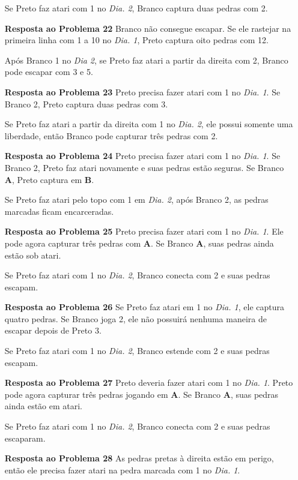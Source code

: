 \begin{itemize}
      Se Preto faz atari com 1 no \emph{Dia. 2}, Branco captura duas pedras com 2.
  \item[\textbf{Resposta ao Problema 22}]
      Branco não consegue escapar. Se ele rastejar na primeira linha com 1 a 10 no \emph{Dia. 1}, Preto captura oito pedras com 12.

      Após Branco 1 no \emph{Dia 2}, se Preto faz atari a partir da direita com 2, Branco pode escapar com 3 e 5.
  \item[\textbf{Resposta ao Problema 23}]
      Preto precisa fazer atari com 1 no \emph{Dia. 1}. Se Branco 2, Preto captura duas pedras com 3.

      Se Preto faz atari a partir da direita com 1 no \emph{Dia. 2}, ele possui somente uma liberdade, então Branco pode capturar três pedras com 2.
  \item[\textbf{Resposta ao Problema 24}]
      Preto precisa fazer atari com 1 no \emph{Dia. 1}. Se Branco 2, Preto faz atari novamente e suas pedras estão seguras. Se Branco \textbf{A}, Preto captura em \textbf{B}.

      Se Preto faz atari pelo topo com 1 em \emph{Dia. 2}, após Branco 2, as pedras marcadas ficam encarceradas.
  \item[\textbf{Resposta ao Problema 25}]
      Preto precisa fazer atari com 1 no \emph{Dia. 1}. Ele pode agora capturar três pedras com \textbf{A}. Se Branco \textbf{A}, suas pedras ainda estão sob atari.

      Se Preto faz atari com 1 no \emph{Dia. 2}, Branco conecta com 2 e suas pedras escapam.
  \item[\textbf{Resposta ao Problema 26}]
      Se Preto faz atari em 1 no \emph{Dia. 1}, ele captura quatro pedras. Se Branco joga 2, ele não possuirá nenhuma maneira de escapar depois de Preto 3.

      Se Preto faz atari com 1 no \emph{Dia. 2}, Branco estende com 2 e suas pedras escapam.
  \item[\textbf{Resposta ao Problema 27}]
      Preto deveria fazer atari com 1 no \emph{Dia. 1}. Preto pode agora capturar três pedras jogando em \textbf{A}. Se Branco \textbf{A}, suas pedras ainda estão em atari.

      Se Preto faz atari com 1 no \emph{Dia. 2}, Branco conecta com 2 e suas pedras escaparam.
  \item[\textbf{Resposta ao Problema 28}]
      As pedras pretas à direita estão em perigo, então ele precisa fazer atari na pedra marcada com 1 no \emph{Dia. 1}.


\end{itemize}
